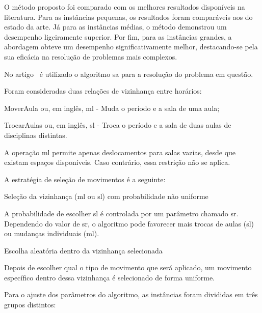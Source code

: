 O método proposto foi comparado com os melhores resultados disponíveis na literatura. Para as instâncias pequenas, os resultados foram comparáveis aos do estado da arte. Já para as instâncias médias, o método demonstrou um desempenho ligeiramente superior. Por fim, para as instâncias grandes, a abordagem obteve um desempenho significativamente melhor, destacando-se pela sua eficácia na resolução de problemas mais complexos.

No artigo~\cite{Featurebasedtuning-Bellio-2016} é utilizado o algoritmo \gls{sa} para a resolução do problema em questão.

Foram consideradas duas relações de vizinhança entre horários:

\begin{compactitem}
    \item MoverAula ou, em inglês, \gls{ml} - Muda o período e a sala de uma aula;

    \item TrocarAulas ou, em inglês, \gls{sl} - Troca o período e a sala de duas aulas de disciplinas distintas.
\end{compactitem}

A operação \gls{ml} permite apenas deslocamentos para salas vazias, desde que existam espaços disponíveis. Caso contrário, essa restrição não se aplica.

A estratégia de seleção de movimentos é a seguinte:

\begin{compactitem}
    \item Seleção da vizinhança (\gls{ml} ou \gls{sl}) com probabilidade não uniforme
    
    A probabilidade de escolher \gls{sl} é controlada por um parâmetro chamado \gls{sr}. Dependendo do valor de \gls{sr}, o algoritmo pode favorecer mais trocas de aulas (\gls{sl}) ou mudanças individuais (\gls{ml}).

    \item Escolha aleatória dentro da vizinhança selecionada
    
    Depois de escolher qual o tipo de movimento que será aplicado, um movimento específico dentro dessa vizinhança é selecionado de forma uniforme.
\end{compactitem}

Para o ajuste dos parâmetros do algoritmo, as instâncias foram divididas em três grupos distintos:

